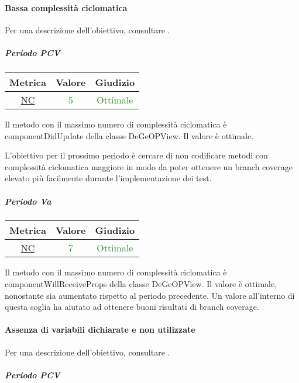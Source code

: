 				\newpage
			\paragraph{Bassa complessità ciclomatica}
			Per una descrizione dell'obiettivo, consultare .
				\subparagraph{Periodo PCV}
				
				\begin{table}[H]
					\centering
					\begin{tabular}{  c | c | c}
						\hline
						\textbf{Metrica} & \textbf{Valore} & \textbf{Giudizio} \\
						\hline
						\hyperref[MMC]{NC}   & \textcolor{ForestGreen}{5}          & \textcolor{ForestGreen}{Ottimale}  \\ \hline
					\end{tabular} 
				\end{table}
			Il metodo con il massimo numero di complessità ciclomatica è componentDidUpdate della classe DeGeOPView. Il valore è ottimale.
			
			L'obiettivo per il prossimo periodo è cercare di non codificare metodi con complessità ciclomatica maggiore in modo da poter ottenere un branch coverage elevato più facilmente durante l'implementazione dei test.
			
			
			\subparagraph{Periodo Va}
			
			\begin{table}[H]
				\centering
				\begin{tabular}{  c | c | c}
					\hline
					\textbf{Metrica} & \textbf{Valore} & \textbf{Giudizio} \\
					\hline
					\hyperref[MMC]{NC}   & \textcolor{ForestGreen}{7}          & \textcolor{ForestGreen}{Ottimale}  \\ \hline
				\end{tabular} 
			\end{table}
			Il metodo con il massimo numero di complessità ciclomatica è componentWillReceiveProps della classe DeGeOPView. Il valore è ottimale, nonostante sia aumentato rispetto al periodo precedente.
			Un valore all'interno di questa soglia ha aiutato ad ottenere buoni risultati di branch coverage. 
			
			
			\newpage
			\paragraph{Assenza di variabili dichiarate e non utilizzate}
			Per una descrizione dell'obiettivo, consultare .
				\subparagraph{Periodo PCV}
			
